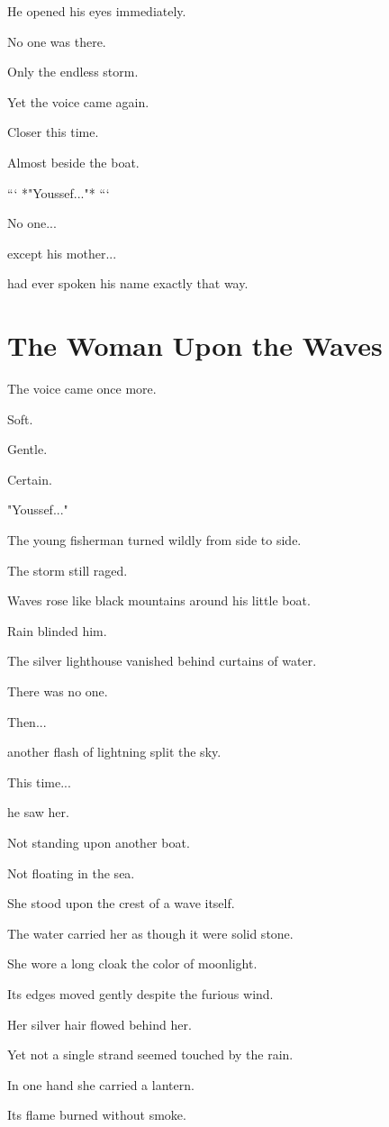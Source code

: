 \documentclass[12pt,openany]{book}
\begin{document}
He opened his eyes immediately.

No one was there.

Only the endless storm.

Yet the voice came again.

Closer this time.

Almost beside the boat.

```
*"Youssef..."*
```

No one...

except his mother...

had ever spoken his name exactly that way.
\section*{The Woman Upon the Waves}

The voice came once more.

Soft.

Gentle.

Certain.

"Youssef..."

The young fisherman turned wildly from side to side.

The storm still raged.

Waves rose like black mountains around his little boat.

Rain blinded him.

The silver lighthouse vanished behind curtains of water.

There was no one.

Then...

another flash of lightning split the sky.

This time...

he saw her.

Not standing upon another boat.

Not floating in the sea.

She stood upon the crest of a wave itself.

The water carried her as though it were solid stone.

She wore a long cloak the color of moonlight.

Its edges moved gently despite the furious wind.

Her silver hair flowed behind her.

Yet not a single strand seemed touched by the rain.

In one hand she carried a lantern.

Its flame burned without smoke.
\end{document}
